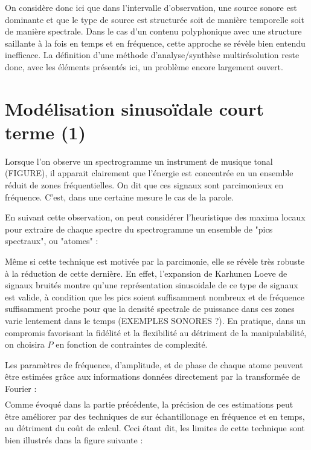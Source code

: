 On considère donc ici que dans l'intervalle d'observation, une source sonore est dominante et que le type de source est structurée soit de manière temporelle soit de manière spectrale. Dans le cas d'un contenu polyphonique avec une structure saillante à la fois en temps et en fréquence, cette approche se révèle bien entendu inefficace. La définition d'une méthode d'analyse/synthèse multirésolution reste donc, avec les éléments présentés ici, un problème encore largement ouvert.

\section{Modélisation sinusoïdale court terme (1)}

Lorsque l'on observe un spectrogramme un instrument de musique tonal (FIGURE), il apparait clairement que l'énergie est concentrée en un ensemble réduit de zones fréquentielles. On dit que ces signaux sont parcimonieux en fréquence. C'est, dans une certaine mesure le cas de la parole.

En suivant cette observation, on peut considérer l'heuristique des maxima locaux pour extraire de chaque spectre du spectrogramme un ensemble de "pics spectraux", ou "atomes" :

Même si cette technique est motivée par la parcimonie, elle se révèle très robuste à la réduction de cette dernière. En effet, l'expansion de Karhunen Loeve de signaux bruités montre qu'une représentation sinusoidale de ce type de signaux est valide, à condition que les pics soient suffisamment nombreux et de fréquence suffisamment proche pour que la densité spectrale de puissance dans ces zones varie lentement dans le temps \cite{mcaulay} (EXEMPLES SONORES ?). En pratique, dans un compromis favorisant la fidélité et la flexibilité au détriment de la manipulabilité, on choisira $P$ en fonction de contraintes de complexité.

Les paramètres de fréquence, d'amplitude, et de phase de chaque atome peuvent être estimées grâce aux informations données directement par la transformée de Fourier :
\begin{eqnarray}
\end{eqnarray}
Comme évoqué dans la partie précédente, la précision de ces estimations peut être améliorer par des techniques de sur échantillonage en fréquence et en temps, au détriment du coût de calcul. Ceci étant dit, les limites de cette technique sont bien illustrés dans la figure suivante :

